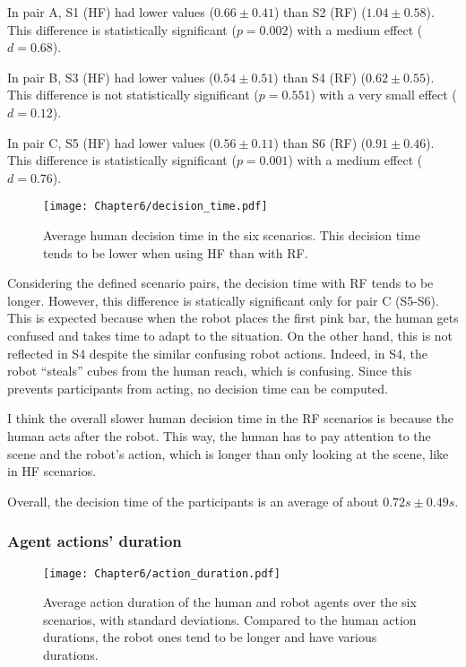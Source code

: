 In pair A, S1 (HF) had lower values ($0.66 \pm 0.41$) than S2 (RF) ($1.04 \pm 0.58$). This difference is statistically significant ($p=0.002$) with a medium effect ($d=0.68$).

In pair B, S3 (HF) had lower values ($0.54 \pm 0.51$) than S4 (RF) ($0.62 \pm 0.55$). This difference is not statistically significant ($p=0.551$) with a very small effect ($d=0.12$).

In pair C, S5 (HF) had lower values ($0.56 \pm 0.11$) than S6 (RF) ($0.91 \pm 0.46$). This difference is statistically significant ($p=0.001$) with a medium effect ($d=0.76$).

\begin{figure}
    \center
    \texttt{[image: Chapter6/decision\_time.pdf]}
    \caption{Average human decision time in the six scenarios. This decision time tends to be lower when using HF than with RF.}
    \label{fig:decision_time}
\end{figure}

Considering the defined scenario pairs, the decision time with RF tends to be longer. However, this difference is statically significant only for pair C (S5-S6). This is expected because when the robot places the first pink bar, the human gets confused and takes time to adapt to the situation. On the other hand, this is not reflected in S4 despite the similar confusing robot actions. Indeed, in S4, the robot ``steals'' cubes from the human reach, which is confusing. Since this prevents participants from acting, no decision time can be computed. 

I think the overall slower human decision time in the RF scenarios is because the human acts after the robot. This way, the human has to pay attention to the scene and the robot's action, which is longer than only looking at the scene, like in HF scenarios.   

Overall, the decision time of the participants is an average of about $0.72s \pm 0.49s$.


\subsubsection*{Agent actions' duration}

\begin{figure}[h]
    \center
    \texttt{[image: Chapter6/action\_duration.pdf]}
    \caption{Average action duration of the human and robot agents over the six scenarios, with standard deviations. Compared to the human action durations, the robot ones tend to be longer and have various durations.}
    \label{fig:action_durations}
\end{figure}


